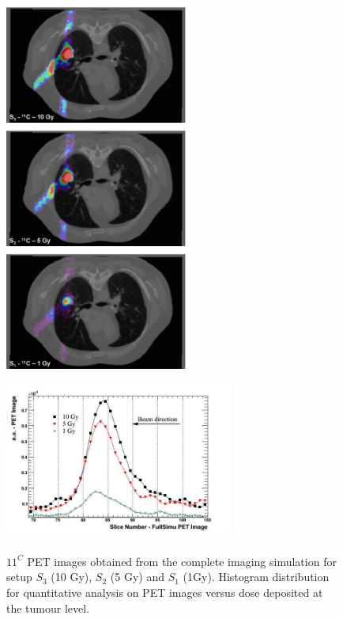 \documentclass[11pt]{iopart}
\begin{document}
\begin{figure}[!h]
  \begin{center}
  \includegraphics[width=6cm,height=40mm]{figures/C11_10Gy_v1.jpg}
  \includegraphics[width=6cm,height=40mm]{figures/C11_5Gy_v1.jpg}
  \includegraphics[width=6cm,height=40mm]{figures/C11_1Gy_v1.jpg}
  \includegraphics[width=75mm,height=55mm]{figures/10-5-1-Gy.jpg}
  \caption{${11}^C$ PET images obtained from the complete imaging simulation for setup $S_{3}$
    (10 Gy), $S_{2}$ (5 Gy) and $S_{1}$ (1Gy). Histogram distribution for quantitative analysis on PET
      images versus dose deposited at the tumour level. }
  \end{center}
  \label{fig:fig5}
\end{figure}
\end{document}
